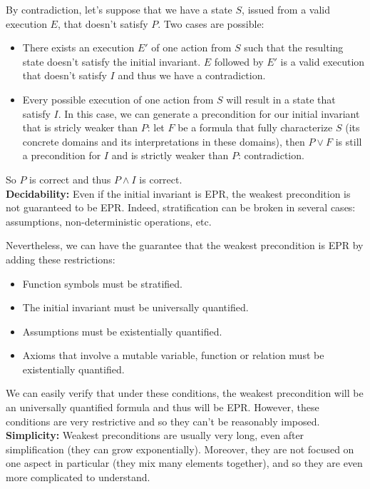 \documentclass[11pt,a4paper,oldfontcommands,openany]{memoir}
\begin{document}
    By contradiction, let's suppose that we have a state \(S\), issued from a valid execution \(E\), that doesn't satisfy \(P\).
    Two cases are possible:
    \begin{itemize}
        \item There exists an execution \(E'\) of one action from \(S\) such that the resulting state doesn't satisfy the initial invariant.
        \(E\) followed by \(E'\) is a valid execution that doesn't satisfy \(I\) and thus we have a contradiction.
        \item Every possible execution of one action from \(S\) will result in a state that satisfy \(I\).
        In this case, we can generate a precondition for our initial invariant that is stricly weaker than \(P\):
        let \(F\) be a formula that fully characterize \(S\) (its concrete domains and its interpretations in these domains),
        then \(P \lor F\) is still a precondition for \(I\) and is strictly weaker than \(P\): contradiction. 
    \end{itemize}

    So \(P\) is correct and thus \(P \land I\) is correct.\\

    \textbf{Decidability:} Even if the initial invariant is EPR, the weakest precondition is not guaranteed to be EPR.
    Indeed, stratification can be broken in several cases: assumptions, non-deterministic operations, etc.

    Nevertheless, we can have the guarantee that the weakest precondition is EPR by adding these restrictions:
    \begin{itemize}
        \item Function symbols must be stratified.
        \item The initial invariant must be universally quantified.
        \item Assumptions must be existentially quantified.
        \item Axioms that involve a mutable variable, function or relation must be existentially quantified.
    \end{itemize}
    We can easily verify that under these conditions, the weakest precondition will be an universally quantified formula
    and thus will be EPR. However, these conditions are very restrictive and so they can't be reasonably imposed.
    \\

    \textbf{Simplicity:} Weakest preconditions are usually very long, even after simplification (they can grow exponentially).
    Moreover, they are not focused on one aspect in particular (they mix many elements together), and so they are even more complicated
    to understand.
\end{document}

